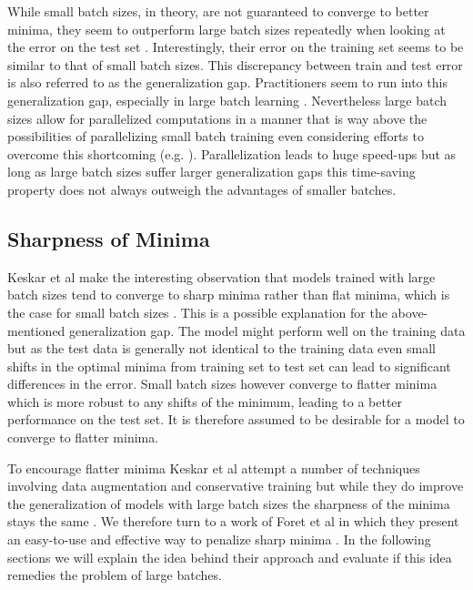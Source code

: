 \documentclass[10pt,conference,compsocconf]{IEEEtran}
\begin{document}
While small batch sizes, in theory, are not guaranteed to converge to better minima, they seem to outperform large batch sizes repeatedly when looking at the error on the test set \cite{keskar2017largebatch}. Interestingly, their error on the training set seems to be similar to that of small batch sizes. This discrepancy between train and test error is also referred to as the generalization gap. Practitioners seem to run into this generalization gap, especially in large batch learning \cite{lecunEfficientBackProp2012}. Nevertheless large batch sizes allow for parallelized computations in a manner that is way above the possibilities of parallelizing small batch training even considering efforts to overcome this shortcoming (e.g. \cite{dasDistributedDeepLearning2016}). Parallelization leads to huge speed-ups but as long as large batch sizes suffer larger generalization gaps this time-saving property does not always outweigh the advantages of smaller batches.

\subsection{Sharpness of Minima}
\label{subsec:sharpness}
Keskar et al make the interesting observation that models trained with large batch sizes tend to converge to sharp minima rather than flat minima, which is the case for small batch sizes \cite{keskar2017largebatch}. This is a possible explanation for the above-mentioned generalization gap. The model might perform well on the training data but as the test data is generally not identical to the training data even small shifts in the optimal minima from training set to test set can lead to significant differences in the error. Small batch sizes however converge to flatter minima which is more robust to any shifts of the minimum, leading to a better performance on the test set. It is therefore assumed to be desirable for a model to converge to flatter minima.

To encourage flatter minima Keskar et al attempt a number of techniques involving data augmentation and conservative training but while they do improve the generalization of models with large batch sizes the sharpness of the minima stays the same \cite{keskar2017largebatch}. We therefore turn to a work of Foret et al in which they present an easy-to-use and effective way to penalize sharp minima \cite{foret2021sharpnessaware}. In the following sections we will explain the idea behind their approach and evaluate if this idea remedies the problem of large batches.
\end{document}
